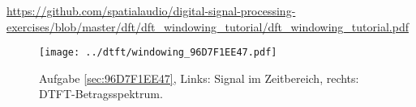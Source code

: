 \url{https://github.com/spatialaudio/digital-signal-processing-exercises/blob/master/dft/dft_windowing_tutorial/dft_windowing_tutorial.pdf}


\begin{figure}
\centering
\texttt{[image: ../dtft/windowing\_96D7F1EE47.pdf]}
\caption{Aufgabe \ref{sec:96D7F1EE47}, Links: Signal im Zeitbereich,
rechts: DTFT-Betragsspektrum.}
\label{fig:windowing_96D7F1EE47}
\end{figure}

